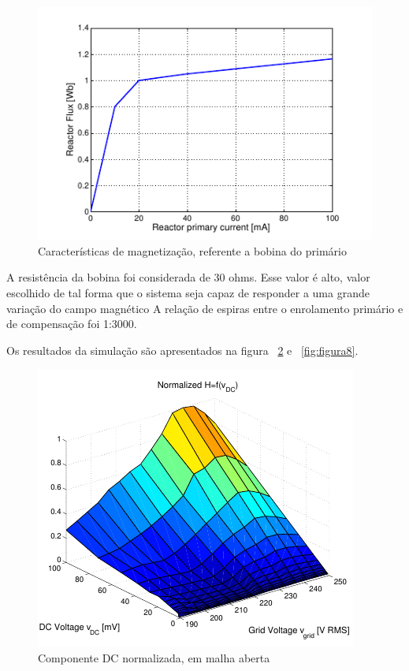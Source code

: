 \documentclass[paper=a4, fontsize=11pt]{article}
\begin{document}
\begin{figure}[!ht]
	\centering
	\includegraphics[scale=.8]{fig6.png}
    \caption{Características de magnetização, referente a bobina do primário}
    \label{fig:figura6}
\end{figure}

A resistência da bobina foi considerada de 30 ohms. Esse valor é alto, valor escolhido
de tal forma que o sistema seja capaz de responder a uma grande variação do campo magnético
A relação de espiras entre o enrolamento primário e de compensação foi 1:3000.

Os resultados da simulação são apresentados na figura ~\ref{fig:figura7} e ~\ref{fig:figura8}.

\begin{figure}[!ht]
	\centering
	\includegraphics[scale=.8]{fig7.png}
    \caption{Componente DC normalizada, em malha aberta}
    \label{fig:figura7}
\end{figure}
\end{document}
